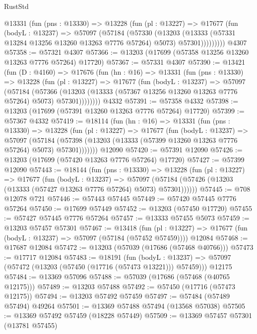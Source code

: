 \begin{lexlean}{RustStd}
\begin{coremodule}
        @13331
          (fun (pns : @13330) =>
          @13228
            (fun (pl : @13227) =>
            @17677
              (fun (bodyL : @13237) =>
              @57097
                (@57184
                  (@57330
                    (@13203
                      (@13333 (@57331 @13284 @13256 @13260 @13263 @7776 @57264) @5073)
                      @57301)))))))))
    @4307
@57358 := @57321 @4307
@57366 := @13203 (@17699 (@57358 @13256 @13260 @13263 @7776 @57264) @17720)
@57367 := @57331 @4307
@57390 := @13421
    (fun (D : @4160) =>
    @17676
      (fun (hn : @16) =>
      @13331
        (fun (pns : @13330) =>
        @13228
          (fun (pl : @13227) =>
          @17677
            (fun (bodyL : @13237) =>
            @57097
              (@57184
                (@57366
                  (@13203 (@13333 (@57367 @13256 @13260 @13263 @7776 @57264) @5073) @57301))))))))
    @4332
@57391 := @57358 @4332
@57398 := @13203 (@17699 (@57391 @13260 @13263 @7776 @57264) @17720)
@57399 := @57367 @4332
@57419 := @18114
    (fun (hn : @16) =>
    @13331
      (fun (pns : @13330) =>
      @13228
        (fun (pl : @13227) =>
        @17677
          (fun (bodyL : @13237) =>
          @57097
            (@57184 (@57398 (@13203 (@13333 (@57399 @13260 @13263 @7776 @57264) @5073) @57301)))))))
    @12090
@57420 := @57391 @12090
@57426 := @13203 (@17699 (@57420 @13263 @7776 @57264) @17720)
@57427 := @57399 @12090
@57443 := @18144
    (fun (pns : @13330) =>
    @13228
      (fun (pl : @13227) =>
      @17677
        (fun (bodyL : @13237) =>
        @57097 (@57184 (@57426 (@13203 (@13333 (@57427 @13263 @7776 @57264) @5073) @57301))))))
@57445 := @708 @12078 @721
@57446 := @57443 @57445
@57449 := @57420 @57445 @7776 @57264
@57450 := @17699 @57449
@57452 := @13203 (@57450 @17720)
@57455 := @57427 @57445 @7776 @57264
@57457 := @13333 @57455 @5073
@57459 := @13203 @57457 @57301
@57467 := @13418
    (fun (pl : @13227) => @17677 (fun (bodyL : @13237) => @57097 (@57184 (@57452 @57459))))
    @12084
@57468 := @17687 @12084
@57472 := @13203 (@57039 (@17686 (@57468 @40766)))
@57473 := @17717 @12084
@57483 := @18191
    (fun (bodyL : @13237) => @57097 (@57472 (@13203 (@57450 (@17716 (@57473 @13221))) @57459)))
    @12175
@57484 := @13369 @57096
@57488 := @57039 (@17686 (@57468 (@40765 @12175)))
@57489 := @13203 @57488
@57492 := @57450 (@17716 (@57473 @12175))
@57494 := @13203 @57492 @57459
@57497 := @57484 (@57489 @57494) @49264
@57501 := @13369 @57488 @57494 (@13568 @57038)
@57505 := @13369 @57492 @57459 (@18228 @57449)
@57509 := @13369 @57457 @57301 (@13781 @57455)

\end{coremodule}
\end{lexlean}

